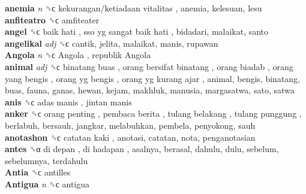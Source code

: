 \textbf{anemia} \emph{n}  ␝ϲ   kekurangan/ketiadaan vitalitas , anemia, kelesuan, lesu  \\
\textbf{anfiteatro} ␝ϲ  amfiteater  \\
\textbf{angel} ␝ϲ   baik hati ,  sso yg sangat baik hati , bidadari, malaikat, santo  \\
\textbf{angelikal} \emph{adj}  ␝ϲ  cantik, jelita, malaikat, manis, rupawan  \\
\textbf{Angola} \emph{n}  ␝ϲ   Angola ,  republik Angola   \\
\textbf{animal} \emph{adj}  ␝ϲ   binatang buas ,  orang bersifat binatang ,  orang biadab ,  orang yang bengis ,  orang yg bengis ,  orang yg kurang ajar , animal, bengis, binatang, buas, fauna, ganas, hewan, kejam, makhluk, manusia, margasatwa, sato, satwa  \\
\textbf{anis} ␝ϲ   adas manis ,  jintan manis   \\
\textbf{anker} ␝ϲ   orang penting ,  pembaca berita ,  tulang belakang ,  tulang punggung , berlabuh, bersauh, jangkar, melabuhkan, pembela, penyokong, sauh  \\
\textbf{anotashon} ␝ϲ   catatan kaki , anotasi, catatan, nota, penganotasian  \\
\textbf{antes} ␝α   di depan ,  di hadapan , asalnya, berasal, dahulu, dulu, sebelum, sebelumnya, terdahulu  \\
\textbf{Antia} ␝ϲ  antilles  \\
\textbf{Antigua} \emph{n}  ␝ϲ  antigua  \\
